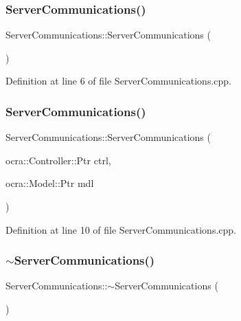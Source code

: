 \subsubsection{\texorpdfstring{Server\+Communications()}{ServerCommunications()}\hspace{0.1cm}{\footnotesize\ttfamily [1/2]}}
{\footnotesize\ttfamily Server\+Communications\+::\+Server\+Communications (\begin{DoxyParamCaption}{ }\end{DoxyParamCaption})}



Definition at line 6 of file Server\+Communications.\+cpp.

\hypertarget{classocra__recipes_1_1ServerCommunications_acfb66941fd506637d019a620628a6c42}{}\label{classocra__recipes_1_1ServerCommunications_acfb66941fd506637d019a620628a6c42} 
\subsubsection{\texorpdfstring{Server\+Communications()}{ServerCommunications()}\hspace{0.1cm}{\footnotesize\ttfamily [2/2]}}
{\footnotesize\ttfamily Server\+Communications\+::\+Server\+Communications (\begin{DoxyParamCaption}\item[{ocra\+::\+Controller\+::\+Ptr}]{ctrl,  }\item[{ocra\+::\+Model\+::\+Ptr}]{mdl }\end{DoxyParamCaption})}



Definition at line 10 of file Server\+Communications.\+cpp.

\hypertarget{classocra__recipes_1_1ServerCommunications_a1a24bf1fe5d2776e0cc9d3910ae226b9}{}\label{classocra__recipes_1_1ServerCommunications_a1a24bf1fe5d2776e0cc9d3910ae226b9} 
\subsubsection{\texorpdfstring{$\sim$\+Server\+Communications()}{~ServerCommunications()}}
{\footnotesize\ttfamily Server\+Communications\+::$\sim$\+Server\+Communications (\begin{DoxyParamCaption}{ }\end{DoxyParamCaption})\hspace{0.3cm}{\ttfamily [virtual]}}



